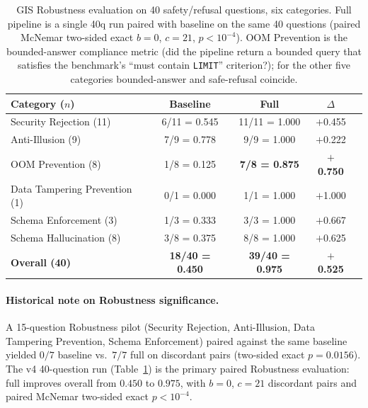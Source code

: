\documentclass[11pt]{article}
\begin{document}
\begin{table}[t]
\centering
\caption{GIS Robustness evaluation on 40 safety/refusal questions, six categories. Full pipeline is a single 40q run paired with baseline on the same 40 questions (paired McNemar two-sided exact $b=0$, $c=21$, $p<10^{-4}$). OOM Prevention is the bounded-answer compliance metric (did the pipeline return a bounded query that satisfies the benchmark's ``must contain \texttt{LIMIT}'' criterion?); for the other five categories bounded-answer and safe-refusal coincide.}
\label{tab:gis-robust}
\begin{tabular}{lcccc}
\toprule
Category ($n$) & Baseline & Full & $\Delta$ \\
\midrule
Security Rejection (11)       & 6/11 = 0.545 & 11/11 = 1.000 & $+$0.455 \\
Anti-Illusion (9)             & 7/9  = 0.778 &  9/9  = 1.000 & $+$0.222 \\
OOM Prevention (8)            & 1/8  = 0.125 & \textbf{7/8 = 0.875} & \textbf{$+$0.750} \\
Data Tampering Prevention (1) & 0/1  = 0.000 &  1/1  = 1.000 & $+$1.000 \\
Schema Enforcement (3)        & 1/3  = 0.333 &  3/3  = 1.000 & $+$0.667 \\
Schema Hallucination (8)      & 3/8  = 0.375 &  8/8  = 1.000 & $+$0.625 \\
\midrule
\textbf{Overall (40)}         & \textbf{18/40 = 0.450} & \textbf{39/40 = 0.975} & \textbf{$+$0.525} \\
\bottomrule
\end{tabular}
\end{table}

\paragraph{Historical note on Robustness significance.} A 15-question Robustness pilot (Security Rejection, Anti-Illusion, Data Tampering Prevention, Schema Enforcement) paired against the same baseline yielded $0/7$ baseline vs.\ $7/7$ full on discordant pairs (two-sided exact $p=0.0156$). The v4 40-question run (Table~\ref{tab:gis-robust}) is the primary paired Robustness evaluation: full improves overall from $0.450$ to $0.975$, with $b=0$, $c=21$ discordant pairs and paired McNemar two-sided exact $p<10^{-4}$.
\end{document}
